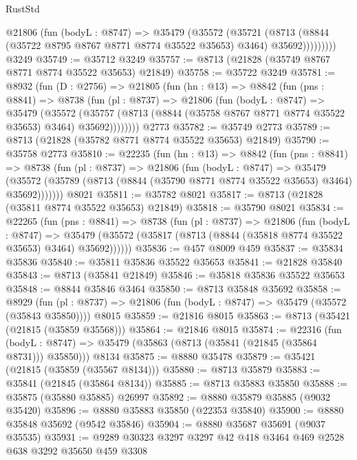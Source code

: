 \begin{lexlean}{RustStd}
\begin{coremodule}
            @21806
              (fun (bodyL : @8747) =>
              @35479
                (@35572
                  (@35721
                    (@8713
                      (@8844 (@35722 @8795 @8767 @8771 @8774 @35522 @35653) @3464)
                      @35692)))))))))
    @3249
@35749 := @35712 @3249
@35757 := @8713 (@21828 (@35749 @8767 @8771 @8774 @35522 @35653) @21849)
@35758 := @35722 @3249
@35781 := @8932
    (fun (D : @2756) =>
    @21805
      (fun (hn : @13) =>
      @8842
        (fun (pns : @8841) =>
        @8738
          (fun (pl : @8737) =>
          @21806
            (fun (bodyL : @8747) =>
            @35479
              (@35572
                (@35757 (@8713 (@8844 (@35758 @8767 @8771 @8774 @35522 @35653) @3464) @35692))))))))
    @2773
@35782 := @35749 @2773
@35789 := @8713 (@21828 (@35782 @8771 @8774 @35522 @35653) @21849)
@35790 := @35758 @2773
@35810 := @22235
    (fun (hn : @13) =>
    @8842
      (fun (pns : @8841) =>
      @8738
        (fun (pl : @8737) =>
        @21806
          (fun (bodyL : @8747) =>
          @35479
            (@35572 (@35789 (@8713 (@8844 (@35790 @8771 @8774 @35522 @35653) @3464) @35692)))))))
    @8021
@35811 := @35782 @8021
@35817 := @8713 (@21828 (@35811 @8774 @35522 @35653) @21849)
@35818 := @35790 @8021
@35834 := @22265
    (fun (pns : @8841) =>
    @8738
      (fun (pl : @8737) =>
      @21806
        (fun (bodyL : @8747) =>
        @35479 (@35572 (@35817 (@8713 (@8844 (@35818 @8774 @35522 @35653) @3464) @35692))))))
@35836 := @457 @8009 @459
@35837 := @35834 @35836
@35840 := @35811 @35836 @35522 @35653
@35841 := @21828 @35840
@35843 := @8713 (@35841 @21849)
@35846 := @35818 @35836 @35522 @35653
@35848 := @8844 @35846 @3464
@35850 := @8713 @35848 @35692
@35858 := @8929
    (fun (pl : @8737) => @21806 (fun (bodyL : @8747) => @35479 (@35572 (@35843 @35850))))
    @8015
@35859 := @21816 @8015
@35863 := @8713 (@35421 (@21815 (@35859 @35568)))
@35864 := @21846 @8015
@35874 := @22316
    (fun (bodyL : @8747) => @35479 (@35863 (@8713 (@35841 (@21845 (@35864 @8731))) @35850)))
    @8134
@35875 := @8880 @35478
@35879 := @35421 (@21815 (@35859 (@35567 @8134)))
@35880 := @8713 @35879
@35883 := @35841 (@21845 (@35864 @8134))
@35885 := @8713 @35883 @35850
@35888 := @35875 (@35880 @35885) @26997
@35892 := @8880 @35879 @35885 (@9032 @35420)
@35896 := @8880 @35883 @35850 (@22353 @35840)
@35900 := @8880 @35848 @35692 (@9542 @35846)
@35904 := @8880 @35687 @35691 (@9037 @35535)
@35931 := @9289
    @30323
    @3297
    @3297
    @42
    @418
    @3464
    @469
    @2528
    @638
    @3292
    @35650
    @459
    @3308

\end{coremodule}
\end{lexlean}
